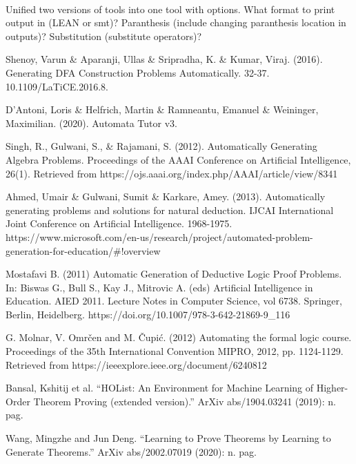 \documentclass{report}
\begin{document}
\paragraph{}
Unified two versions of tools into one tool with options. What format to print output in (LEAN or smt)? Paranthesis (include changing paranthesis location in outputs)? Substitution (substitute operators)?



\begin{thebibliography}{20}
 Shenoy, Varun \& Aparanji, Ullas \& Sripradha, K. \& Kumar, Viraj. (2016). Generating DFA Construction Problems Automatically. 32-37. 10.1109/LaTiCE.2016.8. 


 D'Antoni, Loris \& Helfrich, Martin \& Ramneantu, Emanuel \& Weininger, Maximilian. (2020). Automata Tutor v3. 


 Singh, R., Gulwani, S., \& Rajamani, S. (2012). Automatically Generating Algebra Problems. Proceedings of the AAAI Conference on Artificial Intelligence, 26(1). Retrieved from https://ojs.aaai.org/index.php/AAAI/article/view/8341 


 Ahmed, Umair \& Gulwani, Sumit \& Karkare, Amey. (2013). Automatically generating problems and solutions for natural deduction. IJCAI International Joint Conference on Artificial Intelligence. 1968-1975. https://www.microsoft.com/en-us/research/project/automated-problem-generation-for-education/\#!overview


 Mostafavi B. (2011) Automatic Generation of Deductive Logic Proof Problems. In: Biswas G., Bull S., Kay J., Mitrovic A. (eds) Artificial Intelligence in Education. AIED 2011. Lecture Notes in Computer Science, vol 6738. Springer, Berlin, Heidelberg. https://doi.org/10.1007/978-3-642-21869-9\_116

 G. Molnar, V. Omrčen and M. Čupić. (2012) Automating the formal logic course. Proceedings of the 35th International Convention MIPRO, 2012, pp. 1124-1129. Retrieved from https://ieeexplore.ieee.org/document/6240812

 Bansal, Kshitij et al. “HOList: An Environment for Machine Learning of Higher-Order Theorem Proving (extended version).” ArXiv abs/1904.03241 (2019): n. pag.

 Wang, Mingzhe and Jun Deng. “Learning to Prove Theorems by Learning to Generate Theorems.” ArXiv abs/2002.07019 (2020): n. pag.

\end{thebibliography}
\end{document}
